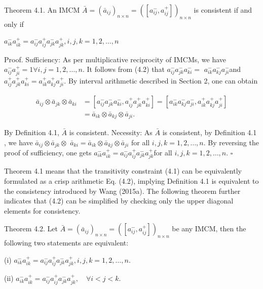 \documentclass[10pt]{article}
\begin{document}
Theorem 4.1. An IMCM $\bar{A}=\left(\bar{a}_{i j}\right)_{n \times n}=\left(\left[a_{i j}^{-}, a_{i j}^{+}\right]\right)_{n \times n}$ is consistent if and only if

$a_{i k}^{-} a_{i k}^{+}=a_{i j}^{-} a_{i j}^{+} a_{j k}^{-} a_{j k}^{+}, i, j, k=1,2, \ldots, n$

Proof. Sufficiency: As per multiplicative reciprocity of IMCMs, we have $a_{i j}^{-} a_{j i}^{+}=1 \forall i, j=1,2, \ldots, n$. It follows from (4.2) that $a_{i j}^{-} a_{j k}^{-} a_{k i}^{-}=$ $a_{i k}^{-} a_{k j}^{-} a_{j i}^{-}$and $a_{i j}^{+} a_{j k}^{+} a_{k i}^{+}=a_{i k}^{+} a_{k j}^{+} a_{j i}^{+}$. By interval arithmetic described in Section 2, one can obtain

$$
\begin{aligned}
\bar{a}_{i j} \otimes \bar{a}_{j k} \otimes \bar{a}_{k i} & =\left[a_{i j}^{-} a_{j k}^{-} a_{k i}^{-}, a_{i j}^{+} a_{j k}^{+} a_{k i}^{+}\right]=\left[a_{i k}^{-} a_{k j}^{-} a_{j i}^{-}, a_{i k}^{+} a_{k j}^{+} a_{j i}^{+}\right] \\
& =\bar{a}_{i k} \otimes \bar{a}_{k j} \otimes \bar{a}_{j i} .
\end{aligned}
$$

By Definition 4.1, $\bar{A}$ is consistent.
Necessity: As $\bar{A}$ is consistent, by Definition 4.1 , we have $\bar{a}_{i j} \otimes \bar{a}_{j k} \otimes$ $\bar{a}_{k i}=\bar{a}_{i k} \otimes \bar{a}_{k j} \otimes \bar{a}_{j i}$ for all $i, j, k=1,2, \ldots, n$. By reversing the proof of sufficiency, one gets $a_{i k}^{-} a_{i k}^{+}=a_{i j}^{-} a_{i j}^{+} a_{j k}^{-} a_{j k}^{+}$for all $i, j, k=1,2, \ldots, n$. $\square$

Theorem 4.1 means that the transitivity constraint (4.1) can be equivalently formulated as a crisp arithmetic Eq. (4.2), implying Definition 4.1 is equivalent to the consistency introduced by Wang (2015a). The following theorem further indicates that (4.2) can be simplified by checking only the upper diagonal elements for consistency.

Theorem 4.2. Let $\bar{A}=\left(\bar{a}_{i j}\right)_{n \times n}=\left(\left[a_{i j}^{-}, a_{i j}^{+}\right]\right)_{n \times n}$ be any IMCM, then the following two statements are equivalent:

(i) $a_{i k}^{-} a_{i k}^{+}=a_{i j}^{-} a_{i j}^{+} a_{j k}^{-} a_{j k}^{+}, i, j, k=1,2, \ldots, n$.

(ii) $a_{i k}^{-} a_{i k}^{+}=a_{i j}^{-} a_{i j}^{+} a_{j k}^{-} a_{j k}^{+}, \quad \forall i<j<k$.
\end{document}
